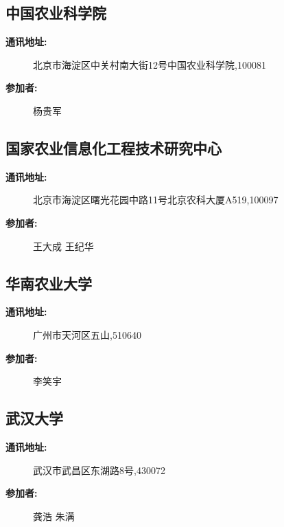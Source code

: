\documentclass[letterpaper,10pt,english]{sphinxmanual}
\begin{document}
\subsection{中国农业科学院}
\label{water_partner:id23}\begin{description}
\item[{\textbf{通讯地址:}}] \leavevmode
北京市海淀区中关村南大街12号中国农业科学院,100081

\item[{\textbf{参加者:}}] \leavevmode
杨贵军

\end{description}


\subsection{国家农业信息化工程技术研究中心}
\label{water_partner:id24}\begin{description}
\item[{\textbf{通讯地址:}}] \leavevmode
北京市海淀区曙光花园中路11号北京农科大厦A519,100097

\item[{\textbf{参加者:}}] \leavevmode
王大成
王纪华

\end{description}


\subsection{华南农业大学}
\label{water_partner:id25}\begin{description}
\item[{\textbf{通讯地址:}}] \leavevmode
广州市天河区五山,510640

\item[{\textbf{参加者:}}] \leavevmode
李笑宇

\end{description}


\subsection{武汉大学}
\label{water_partner:id26}\begin{description}
\item[{\textbf{通讯地址:}}] \leavevmode
武汉市武昌区东湖路8号,430072

\item[{\textbf{参加者:}}] \leavevmode
龚浩
朱满

\end{description}
\end{document}
